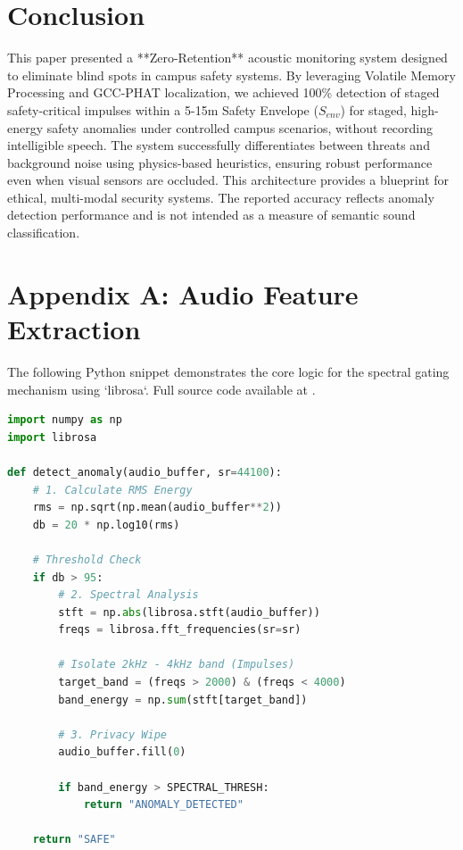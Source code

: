 \documentclass[conference]{IEEEtran}
\begin{document}
\section{Conclusion}
This paper presented a **Zero-Retention** acoustic monitoring system designed to eliminate blind spots in campus safety systems. By leveraging Volatile Memory Processing and GCC-PHAT localization, we achieved 100\% detection of staged safety-critical impulses within a 5-15m Safety Envelope ($S_{env}$) for staged, high-energy safety anomalies under controlled campus scenarios, without recording intelligible speech. The system successfully differentiates between threats and background noise using physics-based heuristics, ensuring robust performance even when visual sensors are occluded. This architecture provides a blueprint for ethical, multi-modal security systems. The reported accuracy reflects anomaly detection performance and is not intended as a measure of semantic sound classification.

\section*{Appendix A: Audio Feature Extraction}
The following Python snippet demonstrates the core logic for the spectral gating mechanism using `librosa`. Full source code available at \cite{scholarmaster_repo}.

\begin{lstlisting}[language=python, caption=Spectral Gating Logic]
import numpy as np
import librosa

def detect_anomaly(audio_buffer, sr=44100):
    # 1. Calculate RMS Energy
    rms = np.sqrt(np.mean(audio_buffer**2))
    db = 20 * np.log10(rms)
      
    # Threshold Check
    if db > 95: 
        # 2. Spectral Analysis
        stft = np.abs(librosa.stft(audio_buffer))
        freqs = librosa.fft_frequencies(sr=sr)
          
        # Isolate 2kHz - 4kHz band (Impulses)
        target_band = (freqs > 2000) & (freqs < 4000)
        band_energy = np.sum(stft[target_band])
          
        # 3. Privacy Wipe
        audio_buffer.fill(0) 
          
        if band_energy > SPECTRAL_THRESH:
            return "ANOMALY_DETECTED"
            
    return "SAFE"
\end{lstlisting}
\end{document}
